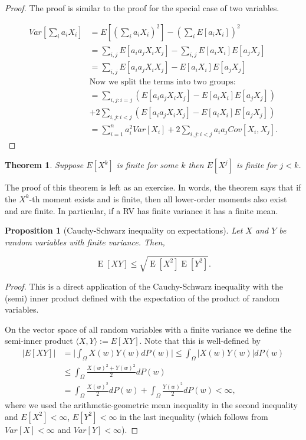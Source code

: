 \documentclass{book}
\theoremstyle{plain}%
\newtheorem{theorem}{Theorem}[section]
\newtheorem{proposition}{Proposition}[section]
\theoremstyle{definition}
\DeclareMathOperator{\E}{E}
\begin{document}
\begin{proof}
The proof is similar to the proof for the special case of two variables.

\begin{align*}
Var[\sum_{i} a_iX_i] &= E[(\sum_{i}a_iX_i)^2] - (\sum_i E[a_iX_i])^2  \\
&= \sum_{i,j} E[a_ia_jX_iX_j] - \sum_{i,j} E[a_iX_i]E[a_jX_j]\\
&= \sum_{i,j} E[a_ia_jX_iX_j] - E[a_iX_i]E[a_jX_j]\\
&\text{Now we split the terms into two groups:} \\
&= \sum_{i,j: i = j} (E[a_ia_jX_iX_j] - E[a_iX_i]E[a_jX_j]) \\ &+ 2 \sum_{i,j: i < j} (E[a_ia_jX_iX_j] - E[a_iX_i]E[a_jX_j])\\
&= \sum_{i=1}^n a_i^2Var[X_i]+ 2\sum_{i,j:i<j}a_ia_jCov[X_i,X_j].
\end{align*}
\end{proof}

\begin{theorem} Suppose $E[X^k]$ is finite for some $k$ then $E[X^j]$ is finite for $j < k$.\label{thm:moments}
\end{theorem}

The proof of this theorem is left as an exercise. In words, the theorem says that if the $X^k$-th moment exists and is finite, then all lower-order moments also exist and are finite. In particular, if a RV has finite variance it has a finite mean.

\begin{proposition}[Cauchy-Schwarz inequality on expectations]
Let $X$ and $Y$ be random variables with finite variance. Then,

$$\E[XY] \leq \sqrt{\E[X^2]\E[Y^2]}.$$\label{prop:cs1}
\end{proposition}

\begin{proof}
This is a direct application of the Cauchy-Schwarz inequality with the (semi) inner product defined with the expectation of the product of random variables.

On the vector space of all random variables with a finite variance we define the semi-inner product $\langle X, Y\rangle:=E[XY]$. Note that this is well-defined by
    \begin{align*}
        |E[XY]|
        &=
        \Big|\int_{\Omega} X(w)Y(w) dP(w)\Big|
        \leq 
        \int_{\Omega}  |X(w)Y(w)| dP(w)\\
        &\leq
        \int_{\Omega}  \frac{X(w)^2+Y(w)^2}{2} dP(w)\\
        &=
        \int_{\Omega}  \frac{X(w)^2}{2} dP(w)
        +
        \int_{\Omega}  \frac{Y(w)^2}{2} dP(w)
        <\infty,
    \end{align*}
where we used the arithmetic-geometric mean inequality in the second inequality and $E[X^2]<\infty$, $E[Y^2]<\infty$
in the last inequality (which follows from $Var[X]<\infty$ and  $Var[Y]<\infty$).
\end{proof}
\end{document}
